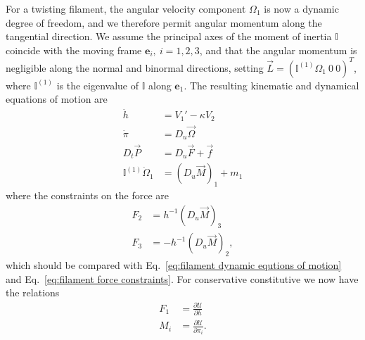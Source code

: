 For a twisting filament, the angular velocity component $\Omega_1$ is now a dynamic degree of freedom, and we therefore permit angular momentum along the tangential direction. We assume the principal axes of the moment of inertia $\mathbb{I}$ coincide with the moving frame $\mathbf{e}_i,\ i=1,2,3$, and that the angular momentum is negligible along the normal and binormal directions, setting $\vec{L} = ( \mathbb{I}^{(1)} \Omega_1\ 0\ 0 )^T$, where $\mathbb{I}^{(1)}$ is the eigenvalue of $\mathbb{I}$ along $\mathbf{e}_1$. The resulting kinematic and dynamical equations of motion are
\begin{subequations} \label{eq:twisting filament dynamic equtions of motion}
\begin{align}
\dot{h} & = V_1' - \kappa V_2 \\
\dot{\pi} & = D_u \vec{\Omega} \\
D_t \vec{P} & = D_u \vec{F} + \vec{f} \\
\mathbb{I}^{(1)} \dot{\Omega}_1 & = (D_u \vec{M})_1 + m_1
\end{align}
\end{subequations}
where the constraints on the force are
\begin{subequations} \label{eq:twisting filament force constraints}
\begin{align}
F_2 & = h^{-1} (D_u \vec{M})_3 \\
F_3 & = - h^{-1} (D_u \vec{M})_2,
\end{align}
\end{subequations}
which should be compared with Eq.~\ref{eq:filament dynamic equtions of motion} and Eq.~\ref{eq:filament force constraints}. For conservative constitutive we now have the relations
\begin{subequations} \label{eq:F1 and M for twisting filament}
\begin{align}
F_1 & =  \frac{\partial \mathcal{U}}{\partial h} \\
M_i & =  \frac{\partial \mathcal{U}}{\partial \pi_i}.
\end{align}
\end{subequations}



